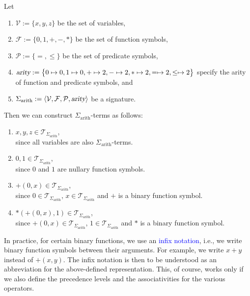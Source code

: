 \exampleEng
Let
\begin{enumerate}
\item $\mathcal{V} := \{ x, y, z \}$ be the set of variables,
\item $\mathcal{F} := \{ 0, 1, \mathtt{+}, \mathtt{-}, * \}$ be the set of function symbols,
\item $\mathcal{P} := \{\mathtt{=}, \leq\}$ be the set of predicate symbols,
\item $\textsl{arity} := \bigl\{ 0 \mapsto 0, 1 \mapsto 0, \mathtt{+} \mapsto 2, \mathtt{-} \mapsto 2,
                                 * \mapsto 2, = \mapsto 2, \leq \mapsto 2 \bigr\}$
      specify the arity of function and predicate symbols, and
\item $\Sigma_\mathrm{arith} := \langle \mathcal{V}, \mathcal{F}, \mathcal{P}, \textsl{arity} \rangle$
      be a signature.
\end{enumerate}
Then we can construct $\Sigma_{\mathrm{arith}}$-terms as follows:
\begin{enumerate}
\item $x, y, z \in \mathcal{T}_{\Sigma_{\mathrm{arith}}}$, \\[0.2cm]
      since all variables are also $\Sigma_{\mathrm{arith}}$-terms.
\item $0, 1 \in \mathcal{T}_{\Sigma_{\mathrm{arith}}}$,  \\[0.2cm]
      since $0$ and $1$ are nullary function symbols.
\item $\mathtt{+}(0,x) \in \mathcal{T}_{\Sigma_{\mathrm{arith}}}$, \\[0.2cm]
      since $0 \in \mathcal{T}_{\Sigma_{\mathrm{arith}}}$, $x \in \mathcal{T}_{\Sigma_{\mathrm{arith}}}$ and 
      $\mathtt{+}$ is a binary function symbol.
\item $*(\mathtt{+}(0,x),1) \in \mathcal{T}_{\Sigma_{\mathrm{arith}}}$, \\[0.2cm]
      since $\mathtt{+}(0,x) \in \mathcal{T}_{\Sigma_{\mathrm{arith}}}$, $1 \in \mathcal{T}_{\Sigma_{\mathrm{arith}}}$ and
      $*$ is a binary function symbol.
\end{enumerate}
In practice, for certain binary functions, we use an \textcolor{blue}{infix notation},
i.e., we write binary function symbols between their arguments. For example,
we write $x+y$ instead of $+(x,y)$. The infix notation is then to be understood as an abbreviation for the
above-defined representation. This, of course, works only if we also define the precedence levels and the
associativities for the various operators. 
\eox

